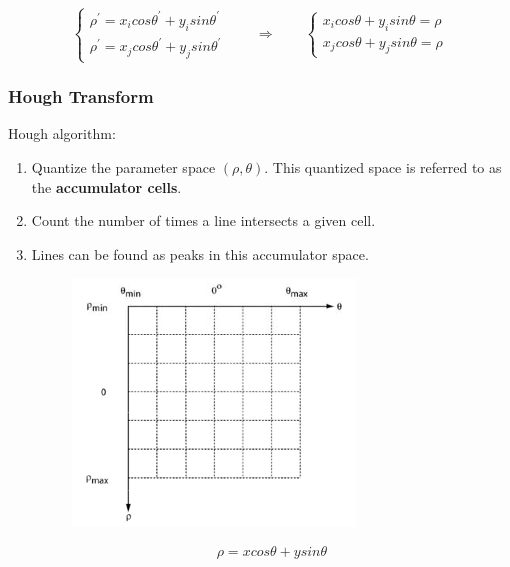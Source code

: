 \documentclass[notheorems,serif,table,compress]{beamer}  %
\begin{document}
\begin{frame}
    \begin{displaymath}
        \left\{ \begin{array}{c}
        \rho^{'}=x_{i}cos\theta^{'} + y_{i}sin\theta^{'}\\
        \rho^{'}=x_{j}cos\theta^{'} + y_{j}sin\theta^{'}
        \end{array} \right.
         \qquad \Longrightarrow \qquad
        \left\{ \begin{array}{c}
        x_{i}cos\theta + y_{i}sin\theta= \rho\\
        x_{j}cos\theta + y_{j}sin\theta= \rho
        \end{array} \right.
    \end{displaymath}
\end{frame}

\begin{frame}
\frametitle{Hough Transform}
{\color{blue}Hough algorithm:}
    \begin{enumerate}
        \item Quantize the parameter space $(\rho,\theta)$. This quantized space is referred to as the {\textbf{accumulator cells}}.
        \item Count the number of times a line intersects a given cell.
        \item Lines can be found as peaks in this accumulator space.
            \begin{figure}
            \includegraphics[width=0.5\linewidth]{hough4.png}
            \end{figure}
            \begin{displaymath}
            \rho=xcos\theta + ysin\theta
            \end{displaymath}
    \end{enumerate}
\end{frame}
\end{document}
